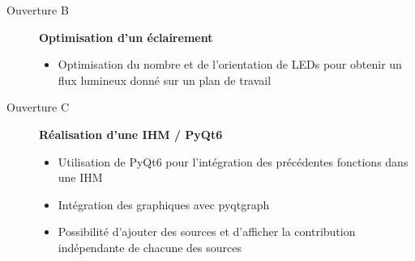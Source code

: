 \documentclass[10pt]{article} %
\begin{document}
\begin{description}
\qquad

	\item[Ouverture B] \textbf{Optimisation d'un éclairement}
	
	\begin{itemize}
		\item Optimisation du nombre et de l'orientation de LEDs pour obtenir un flux lumineux donné sur un plan de travail
	\end{itemize}	

\qquad
	
	\item[Ouverture C] \textbf{Réalisation d'une IHM / PyQt6}
	\begin{itemize}
		\item Utilisation de PyQt6 pour l'intégration des précédentes fonctions dans une IHM
		\item Intégration des graphiques avec pyqtgraph
		\item Possibilité d'ajouter des sources et d'afficher la contribution indépendante de chacune des sources		
	\end{itemize}
	
\end{description}

\newpage

\hypertarget{stepbystep}{}
\end{document}
